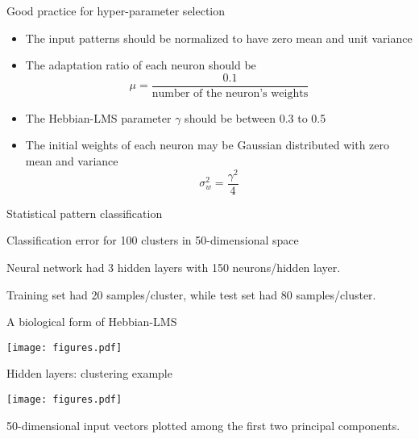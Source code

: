 \documentclass[10pt]{beamer}
\DeclareRobustCommand\sampleline[1]{%
	\tikz\draw[#1] (0,0) (0,\the\dimexpr\fontdimen22\textfont2\relax)
	-- (2em,\the\dimexpr\fontdimen22\textfont2\relax);%
}
\begin{document}
\begin{frame}{Good practice for hyper-parameter selection}
\begin{itemize}
\item The input patterns should be normalized to have zero mean and unit variance

\item The adaptation ratio of each neuron should be
\begin{equation*}
	\mu = \frac{0.1}{\text{number of the neuron's weights}}
\end{equation*} 
\item The Hebbian-LMS parameter $\gamma$ should be between 0.3 to 0.5

\item The initial weights of each neuron may be Gaussian distributed with zero mean and variance 
\begin{equation*}
	\sigma_w^2 = \frac{\gamma^2}{4}
\end{equation*} 
\end{itemize}
\end{frame}

\begin{frame}{Statistical pattern classification}

Classification error for 100 clusters in 50-dimensional space

Neural network had 3 hidden layers with 150 neurons/hidden layer.

\begin{center}
	\resizebox{0.7\textwidth}{!}{}
\end{center}

Training set had 20 samples/cluster, while test set had 80 samples/cluster.
\end{frame}


\begin{frame}{A biological form of Hebbian-LMS}
\begin{center}
	\texttt{[image: figures.pdf]}
\end{center}
\end{frame}

\begin{frame}{Hidden layers: clustering example}
\begin{center}
	\texttt{[image: figures.pdf]}
\end{center}
\large 50-dimensional input vectors plotted among the first two principal components.
\end{frame}
\end{document}
